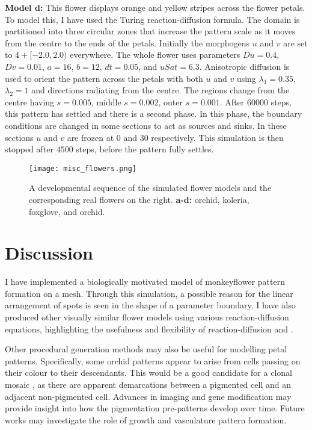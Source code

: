 \textbf{Model d:}
This flower displays orange and yellow stripes across the flower petals. To model this, I have used the Turing reaction-diffusion formula. The domain is partitioned into three circular zones that increase the pattern scale as it moves from the centre to the ends of the petals. Initially the morphogens $u$ and $v$ are set to $4 + [-2.0, 2.0)$ everywhere. The whole flower uses parameters $Du=0.4$, $Dv=0.01$, $a=16$, $b=12$, $dt=0.05$, and $uSat=6.3$. Anisotropic diffusion is used to orient the pattern across the petals with both $u$ and $v$ using $\lambda_1=0.35$, $\lambda_2=1$ and directions radiating from the centre. The regions change from the centre having $s=0.005$, middle $s=0.002$, outer $s=0.001$. After $60000$ steps, this pattern has settled and there is a second phase. In this phase, the boundary conditions are changed in some sections to act as sources and sinks. In these sections $u$ and $v$ are frozen at $0$ and $30$ respectively. This simulation is then stopped after $4500$ steps, before the pattern fully settles.

\begin{figure}[p]
	\centering
	\texttt{[image: misc\_flowers.png]}
	\caption{A developmental sequence of the simulated flower models and the corresponding real flowers on the right. \textbf{a-d:} orchid, koleria, foxglove, and orchid.}
	\label{fig:miscFlowers}
\end{figure}

\section{Discussion}

I have implemented a biologically motivated model of monkeyflower pattern formation on a mesh. Through this simulation, a possible reason for the linear arrangement of spots is seen in the shape of a parameter boundary. I have also produced other visually similar flower models using various reaction-diffusion equations, highlighting the usefulness and flexibility of reaction-diffusion and \ProgramName{}.

Other procedural generation methods may also be useful for modelling petal patterns. Specifically, some orchid patterns appear to arise from cells passing on their colour to their descendants. This would be a good candidate for a clonal mosaic \citep{korn2007}, as there are apparent demarcations between a pigmented cell and an adjacent non-pigmented cell. Advances in imaging and gene modification may provide insight into how the pigmentation pre-patterns develop over time. Future works may investigate the role of growth and vasculature pattern formation.